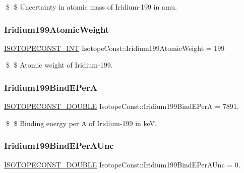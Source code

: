 \$ \$ Uncertainty in atomic mass of Iridium-\/199 in amu. \mbox{\label{group___isotope_const-_iridium-_ir199_ga4520e95fbcf54c444a397f913e222ef4}} 
\subsubsection{\texorpdfstring{Iridium199\+Atomic\+Weight}{Iridium199AtomicWeight}}
{\footnotesize\ttfamily \mbox{\hyperlink{group___isotope_const-_macros_ga5f18360b3e99483a35c32d789e62621c}{I\+S\+O\+T\+O\+P\+E\+C\+O\+N\+S\+T\+\_\+\+I\+NT}} Isotope\+Const\+::\+Iridium199\+Atomic\+Weight = 199}

\$ \$ Atomic weight of Iridium-\/199. \mbox{\label{group___isotope_const-_iridium-_ir199_ga7a72514f671a4ec5dfa1315da45754d7}} 
\subsubsection{\texorpdfstring{Iridium199\+Bind\+E\+PerA}{Iridium199BindEPerA}}
{\footnotesize\ttfamily \mbox{\hyperlink{group___isotope_const-_macros_ga8f45a7272ce02c0b4c65c44636ed719a}{I\+S\+O\+T\+O\+P\+E\+C\+O\+N\+S\+T\+\_\+\+D\+O\+U\+B\+LE}} Isotope\+Const\+::\+Iridium199\+Bind\+E\+PerA = 7891.}

\$ \$ Binding energy per A of Iridium-\/199 in keV. \mbox{\label{group___isotope_const-_iridium-_ir199_ga9431ffa667056c4e413292a13936ea28}} 
\subsubsection{\texorpdfstring{Iridium199\+Bind\+E\+Per\+A\+Unc}{Iridium199BindEPerAUnc}}
{\footnotesize\ttfamily \mbox{\hyperlink{group___isotope_const-_macros_ga8f45a7272ce02c0b4c65c44636ed719a}{I\+S\+O\+T\+O\+P\+E\+C\+O\+N\+S\+T\+\_\+\+D\+O\+U\+B\+LE}} Isotope\+Const\+::\+Iridium199\+Bind\+E\+Per\+A\+Unc = 0.}

